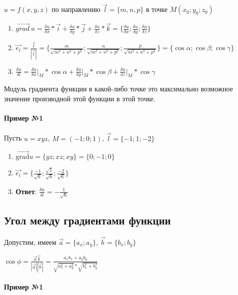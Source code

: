 \documentclass{article}
\begin{document}
$u = f(x, y, z)$ по направлению $\vec{l} = \{ m, n, p \}$ в точке $M (x_0; y_0; z_0)$

\begin{enumerate}
    \item $\vec{grad} \ u = \frac{\delta u}{\delta x} * \vec{i} + \frac{\delta u}{\delta y} * \vec{j} + \frac{\delta u}{\delta z} * \vec{k} = \{ \frac{\delta u}{\delta x}; \frac{\delta u}{\delta y}; \frac{\delta u}{\delta z} \}$
    \item $\vec{e_{l}} = \frac{\vec{l}}{|\vec{l}|} = \{ \frac{m}{\sqrt{m^2 + n^2 + p^2}}; \frac{n}{\sqrt{m^2 + n^2 + p^2}}; \frac{p}{\sqrt{m^2 + n^2 + p^2}} \} = \{ \cos \alpha; \cos \beta; \cos \gamma \}$
    \item $\frac{\delta u}{\delta l} = \frac{\delta u}{\delta x} \bigg|_{M} * \cos \alpha + \frac{\delta u}{\delta y} \bigg|_{M} * \cos \beta + \frac{\delta u}{\delta z} \bigg|_{M} * \cos \gamma$
\end{enumerate}

Модуль градиента функции в какой-либо точке это максимально возможное значение производной этой функции в этой точке.

\paragraph{Пример №1} Пусть $u = x y z$, $M = (-1; 0; 1)$, $\vec{l} = \{ -1; 1; -2 \}$

\begin{enumerate}
    \item $\vec{\text{grad}} u = \{ y z; x z; x y \} = \{ 0; -1; 0 \}$
    \item $\vec{e_{l}} = \{ \frac{-1}{\sqrt{6}}; \frac{\sqrt{1}}{\sqrt{6}}; \frac{-2}{\sqrt{6}} \}$
    \item \textbf{Ответ}: $\frac{\delta u}{\delta l} = - \frac{1}{\sqrt{6}}$
\end{enumerate}

\subsection{Угол между градиентами функции}

Допустим, имеем $\vec{a} = \{ a_{x}; a_{y} \}$, $\vec{b} = \{ b_{x}; b_{y} \}$

$\cos \phi = \frac{\vec{a} \vec{b}}{|\vec{a}| |\vec{b}|} = \frac{a_{x} b_{x} + a_{y} b_{y}}{\sqrt{a_{x}^2 + a_{y}^2} * \sqrt{b_{x}^2 + b_{y}^2}}$

\paragraph{Пример №1}
\end{document}
